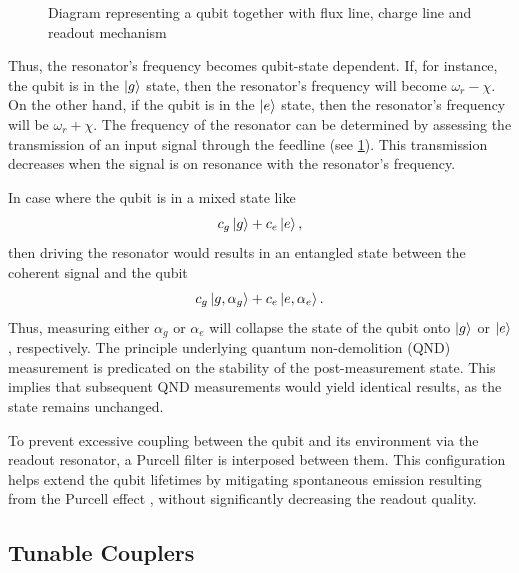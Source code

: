 \begin{figure}
    \centering
    
    \vspace{-1cm}
    \caption{Diagram representing a qubit together with flux line, charge line and readout mechanism}
    \label{fig:diagram_storage_qubit}
\end{figure}

Thus, the resonator's frequency becomes qubit-state dependent.
If, for instance, the qubit is in the $\ket{g}$ state, then the resonator's frequency will become $\omega_r - \chi$.
On the other hand, if the qubit is in the $\ket{e}$ state, then the resonator's frequency will be $\omega_r + \chi$.
The frequency of the resonator can be determined by assessing the transmission of an input signal through the feedline (see \cref{fig:diagram_storage_qubit}).
This transmission decreases when the signal is on resonance with the resonator's frequency.

In case where the qubit is in a mixed state like
\begin{equation}
    c_g \ket{g} + c_e \ket{e} ,
\end{equation}
then driving the resonator would results in an entangled state between the coherent signal and the qubit
\begin{equation}
    c_g \ket{g, \alpha_g} + c_e \ket{e, \alpha_e} .
\end{equation}
Thus, measuring either $\alpha_g$ or $\alpha_e$ will collapse the state of the qubit onto $\ket{g}$ or $\ket{e}$, respectively.
The principle underlying quantum non-demolition (QND) measurement is predicated on the stability of the post-measurement state.
This implies that subsequent QND measurements would yield identical results, as the state remains unchanged.

To prevent excessive coupling between the qubit and its environment via the readout resonator, a Purcell filter is interposed between them.
This configuration helps extend the qubit lifetimes by mitigating spontaneous emission resulting from the Purcell effect \cite{Purcell_effect}, without significantly decreasing the readout quality.

\subsection{Tunable Couplers}

